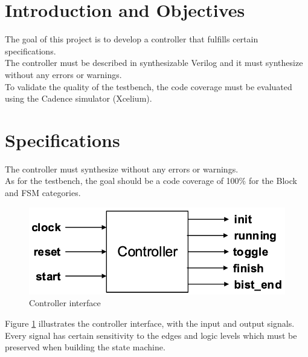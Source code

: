 \documentclass[12pt]{article}
\begin{document}
	\newpage

    \tableofcontents

	\newpage



	\section{Introduction and Objectives}
	The goal of this project is to develop a controller that fulfills certain specifications.\\
	The controller must be described in synthesizable Verilog and it must synthesize without any errors or warnings. \\
	To validate the quality of the testbench, the code coverage must be evaluated using the Cadence simulator (Xcelium).
	
	\section{Specifications}
	The controller must synthesize without any errors or warnings.\\
	As for the testbench, the goal should be a code coverage of 100$\%$ for the Block and FSM categories. 
	\begin{figure}[!htb]
        \centering
        \includegraphics[scale=0.5]{images/controller_interface.png}
            \caption{Controller interface}
            \label{fig:ci}
    \end{figure}
    
	Figure \ref{fig:ci} illustrates the controller interface, with the input and output signals. Every signal has certain sensitivity to the edges and logic levels which must be preserved when building the state machine.\\
    \:
    
\end{document}
